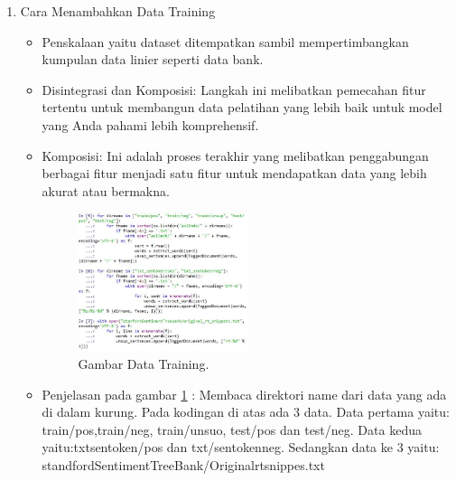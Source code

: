 \begin{enumerate}
\item Cara Menambahkan Data Training
	\begin{itemize}
	\item Penskalaan yaitu dataset ditempatkan sambil mempertimbangkan kumpulan data linier seperti data bank.
	\item  Disintegrasi dan Komposisi: Langkah ini melibatkan pemecahan fitur tertentu untuk membangun data pelatihan yang lebih baik untuk model yang Anda pahami lebih komprehensif.
	\item Komposisi: Ini adalah proses terakhir yang melibatkan penggabungan berbagai fitur menjadi satu fitur untuk mendapatkan data yang lebih akurat atau bermakna.
		\begin{figure}[ht]
		\centerline{\includegraphics[width=0.5\textwidth]{figures/chapter5/19data.jpg}}
		\caption{Gambar Data Training.}	
		\label{19data}
		\end{figure}
		\item  Penjelasan pada gambar \ref{19data} : Membaca direktori name dari data yang ada di dalam kurung. Pada kodingan di atas ada 3 data. Data pertama yaitu: train/pos,train/neg, train/unsuo, test/pos dan test/neg. Data kedua yaitu:txtsentoken/pos dan txt/sentokenneg. Sedangkan data ke 3 yaitu: standfordSentimentTreeBank/Originalrtsnippes.txt
		\end{itemize}



\end{enumerate}
